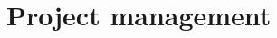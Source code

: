 \documentclass[../main.tex]{subfiles}
\begin{document}
\pagebreak
\section{Project management}
\end{document}
